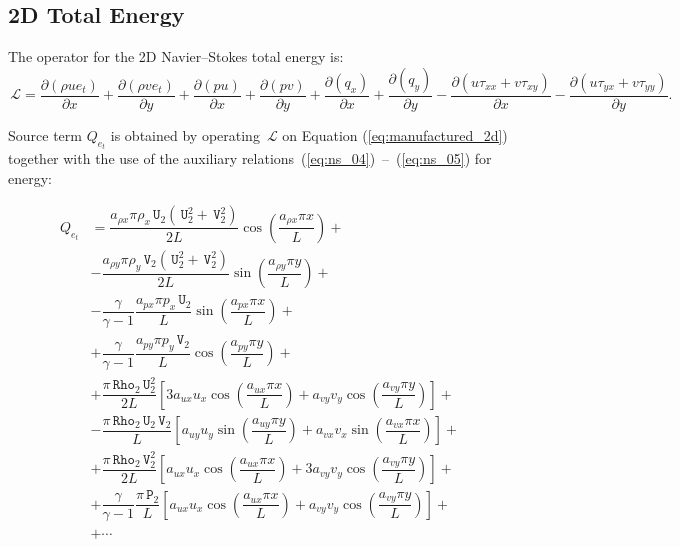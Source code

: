 \documentclass[10pt]{article}
\newcommand{\Diff}[2] {\dfrac{\partial( #1)}{\partial #2}}
\newcommand{\Rho}{\,\mathtt{Rho}}
\newcommand{\PP}{\,\mathtt{P}}
\newcommand{\U}{\,\mathtt{U}}
\newcommand{\V}{\,\mathtt{V}}
\newcommand{\Lo}{\,\mathcal{L}}
\begin{document}
\subsection{2D Total Energy}

The operator for the 2D Navier--Stokes total energy is:
\begin{equation*}
 \Lo=  \Diff{\rho ue_t }{x}+\Diff{\rho ve_t}{y}+\Diff{pu}{x} +\Diff{pv}{y}+\Diff{q_x}{x}+\Diff{q_y}{y}-\Diff{u\tau_{xx}+v\tau_{xy}}{x}-\Diff{u\tau_{yx}+v\tau_{yy}}{y}.
\end{equation*}


Source term $Q_{e_t}$ is obtained by operating $\Lo$ on Equation  (\ref{eq:manufactured_2d}) together with the use of the  auxiliary relations~(\ref{eq:ns_04})~--~(\ref{eq:ns_05}) for energy:

\begin{equation*}
 \begin{split}\label{eq:source_e_2d}
Q_{e_t} &=\dfrac{ a_{\rho x} \pi \rho_x  \U_2 (\U_2^2+\V_2^2)}{2L}\cos\left(\dfrac{a_{\rho x} \pi x}{L}\right)+\\
&-\dfrac{ a_{\rho y} \pi \rho_y \V_2 (\U_2^2+\V_2^2) }{2L}\sin\left(\dfrac{a_{\rho y} \pi y}{L}\right) +\\
&-\dfrac{\gamma}{\gamma-1}\dfrac{a_{px} \pi p_x  \U_2}{L}\sin\left(\dfrac{a_{px} \pi x}{L}\right) +\\
&+  \dfrac{\gamma}{\gamma-1}\dfrac{a_{py}\pi p_y  \V_2}{L}\cos\left(\dfrac{a_{py} \pi y}{L}\right)+\\
&+ \dfrac{ \pi \Rho_2 \U_2^2}{2L}\left[3 a_{ux} u_x \cos\left(\dfrac{a_{ux} \pi x}{L}\right)+a_{vy} v_y \cos\left(\dfrac{a_{vy} \pi y}{L}\right)\right]+\\
&-\dfrac{\pi \Rho_2 \U_2 \V_2}{L}\left[a_{uy} u_y \sin\left(\dfrac{a_{uy} \pi y}{L}\right)+a_{vx}  v_x\sin\left(\dfrac{a_{vx} \pi x}{L}\right)\right] +\\
&+\dfrac{\pi \Rho_2 \V_2^2}{2L} \left[a_{ux} u_x \cos\left(\dfrac{a_{ux} \pi x}{L}\right)+3 a_{vy} v_y \cos\left(\dfrac{a_{vy} \pi y}{L}\right)\right] +\\
&+ \dfrac{\gamma}{\gamma-1}\dfrac{\pi \PP_2}{L}\left[a_{ux} u_x \cos\left(\dfrac{a_{ux} \pi x}{L}\right)+a_{vy} v_y \cos\left(\dfrac{a_{vy} \pi y}{L}\right)\right]+\\
%
&+ \cdots \\
%
 \end{split}
\end{equation*}
\end{document}
